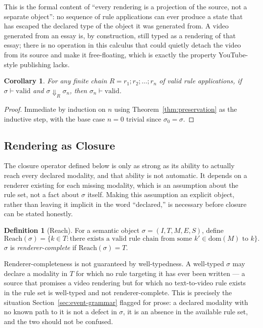 \documentclass[11pt]{article}
\newtheorem{corollary}[theorem]{Corollary}
\theoremstyle{definition}
\newtheorem{definition}[theorem]{Definition}
\begin{document}
This is the formal content of ``every rendering is a projection of the source, not a separate object'': no sequence of rule applications can ever produce a state that has escaped the declared type of the object it was generated from. A video generated from an essay is, by construction, still typed as a rendering of that essay; there is no operation in this calculus that could quietly detach the video from its source and make it free-floating, which is exactly the property YouTube-style publishing lacks.

\begin{corollary}
\label{cor:chain-preservation}
For any finite chain $R = r_1; r_2; \dots; r_n$ of valid rule applications, if $\sigma \vdash \mathrm{valid}$ and $\sigma \Downarrow_R \sigma_n$, then $\sigma_n \vdash \mathrm{valid}$.
\end{corollary}

\begin{proof}
Immediate by induction on $n$ using Theorem~\ref{thm:preservation} as the inductive step, with the base case $n = 0$ trivial since $\sigma_0 = \sigma$.
\end{proof}

\subsection{Rendering as Closure}

The closure operator defined below is only as strong as its ability to actually reach every declared modality, and that ability is not automatic. It depends on a renderer existing for each missing modality, which is an assumption about the rule set, not a fact about $\sigma$ itself. Making this assumption an explicit object, rather than leaving it implicit in the word ``declared,'' is necessary before closure can be stated honestly.

\begin{definition}[Reach]
\label{def:reach}
For a semantic object $\sigma = (I, T, M, E, S)$, define
\[
\mathrm{Reach}(\sigma) = \{k \in T : \text{there exists a valid rule chain from some } k' \in \mathrm{dom}(M) \text{ to } k\}.
\]
$\sigma$ is \emph{renderer-complete} if $\mathrm{Reach}(\sigma) = T$.
\end{definition}

Renderer-completeness is not guaranteed by well-typedness. A well-typed $\sigma$ may declare a modality in $T$ for which no rule targeting it has ever been written --- a source that promises a video rendering but for which no text-to-video rule exists in the rule set is well-typed and not renderer-complete. This is precisely the situation Section~\ref{sec:event-grammar} flagged for prose: a declared modality with no known path to it is not a defect in $\sigma$, it is an absence in the available rule set, and the two should not be confused.
\end{document}
